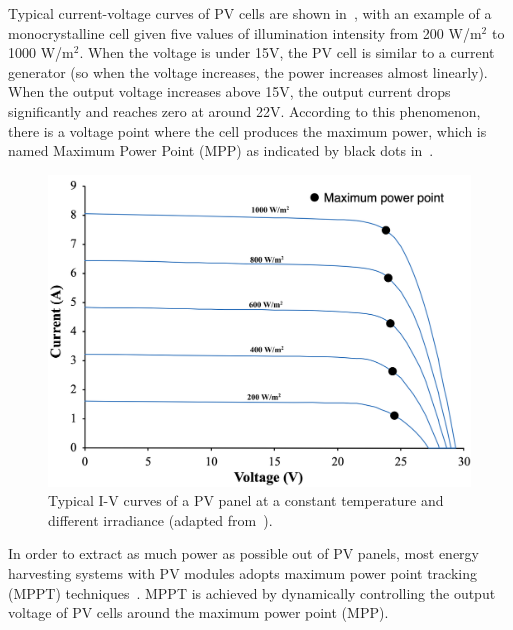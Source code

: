 Typical current-voltage curves of PV cells are shown in~, with an example of a monocrystalline cell given five values of illumination intensity from 200 W/m$^{2}$ to 1000 W/m$^{2}$. When the voltage is under 15V, the PV cell is similar to a current generator (so when the voltage increases, the power increases almost linearly). When the output voltage increases above 15V, the output current drops significantly and reaches zero at around 22V. According to this phenomenon, there is a voltage point where the cell produces the maximum power, which is named Maximum Power Point (MPP) as indicated by black dots in~. 

\begin{figure}
    \centering
    \includegraphics[width=0.9\columnwidth]{ch2_review/figures/solar_iv_pic.png}
    \caption[Typical I-V curves of a PV panel at a constant temperature and different irradiance.]{Typical I-V curves of a PV panel at a constant temperature and different irradiance (adapted from~\cite{ciulla2014comparison}\footnotemark).}
    \label{Figure:solar_vi}
\end{figure}

In order to extract as much power as possible out of PV panels, most energy harvesting systems with PV modules adopts maximum power point tracking (MPPT) techniques~\cite{lopez2010new, paz2016high, verma2016maximum}. MPPT is achieved by dynamically controlling the output voltage of PV cells around the maximum power point (MPP).

